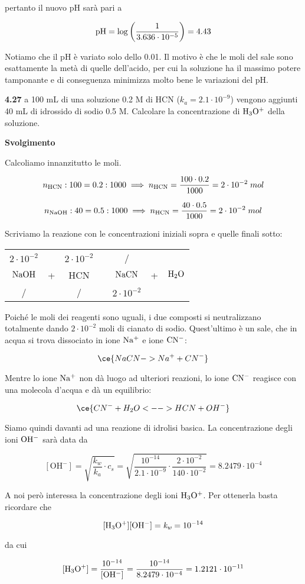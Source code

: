 pertanto il nuovo pH sarà pari a

$$\rm pH=\log{\left(\frac{1}{3.636 \cdot 10^{-5}}\right)}=4.43$$

Notiamo che il pH è variato solo dello 0.01. Il motivo è che le moli del sale sono esattamente la metà di quelle dell'acido, per cui la soluzione ha il massimo potere tamponante e di conseguenza minimizza molto bene le variazioni del pH.

\vspace{0.2cm}\textbf{4.27} a 100 mL di una soluzione 0.2 M di HCN ($k_a=2.1 \cdot 10^{-9}$) vengono aggiunti 40 mL di idrossido di sodio 0.5 M. Calcolare la concentrazione di $\rm H_3O^+$ della soluzione.

\vspace{0.2cm}\large\textbf{Svolgimento}\normalsize

Calcoliamo innanzitutto le moli.

$$n_{\rm HCN}:100=0.2:1000
\implies
n_{\rm HCN}=\frac{100 \cdot 0.2}{1000}=2 \cdot 10^{-2}\;mol$$

$$n_{\rm NaOH}:40=0.5:1000
\implies
n_{\rm HCN}=\frac{40 \cdot 0.5}{1000}=2 \cdot 10^{-2}\;mol$$

Scriviamo la reazione con le concentrazioni iniziali sopra e quelle finali sotto:

\begin{center}
    \begin{tabular}{ccccccc}
        $2 \cdot 10^{-2}$ &  & $2 \cdot 10^{-2}$ & & / &&\\
        $\rm NaOH$ & + & HCN & \ce{->} & $\rm NaCN$ & + & $\rm H_2O$\\
        / &  &  / & & $2 \cdot 10^{-2}$ &&\\
    \end{tabular}
\end{center}

Poiché le moli dei reagenti sono uguali, i due composti si neutralizzano totalmente dando $2 \cdot 10^{-2}$ moli di cianato di sodio. Quest'ultimo è un sale, che in acqua si trova dissociato in ione $\rm Na^+$ e ione $\rm CN^-$:

$$\ce{NaCN -> Na^+ + CN^-}$$

Mentre lo ione $\rm Na^+$ non dà luogo ad ulteriori reazioni, lo ione $\rm CN^-$ reagisce con una molecola d'acqua e dà un equilibrio:

$$\ce{CN^- + H_2O <--> HCN + OH^-}$$

Siamo quindi davanti ad una reazione di idrolisi basica. La concentrazione degli ioni $\rm OH^-$ sarà data da

$$[\text{OH}^-]
=\sqrt{\frac{k_w}{k_a}\cdot c_s}
=\sqrt{\frac{10^{-14}}{2.1 \cdot 10^{-9}} \cdot \frac{2 \cdot 10^{-2}}{140 \cdot 10^{-2}}}
=8.2479 \cdot 10^{-4}$$

A noi però interessa la concentrazione degli ioni $\rm H_3O^+$. Per ottenerla basta ricordare che

$$\rm [H_3O^+][OH^-]=\textit{k}_{\textit{w}}=10^{-14}$$

da cui

$$\rm [H_3O^+]
=\frac{10^{-14}}{[OH^-]}
=\frac{10^{-14}}{8.2479 \cdot 10^{-4}}=1.2121 \cdot 10^{-11}$$